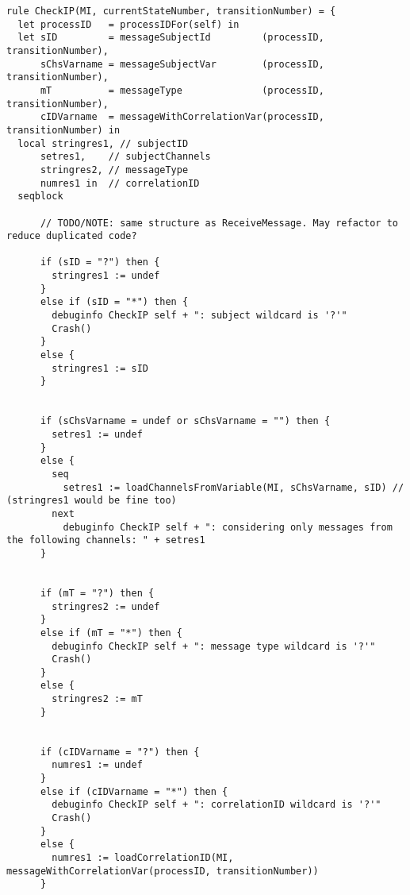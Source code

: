 \begin{listing}[H]
\begin{verbatim}
rule CheckIP(MI, currentStateNumber, transitionNumber) = {
  let processID   = processIDFor(self) in
  let sID         = messageSubjectId         (processID, transitionNumber),
      sChsVarname = messageSubjectVar        (processID, transitionNumber),
      mT          = messageType              (processID, transitionNumber),
      cIDVarname  = messageWithCorrelationVar(processID, transitionNumber) in
  local stringres1, // subjectID
      setres1,    // subjectChannels
      stringres2, // messageType
      numres1 in  // correlationID
  seqblock

      // TODO/NOTE: same structure as ReceiveMessage. May refactor to reduce duplicated code?

      if (sID = "?") then {
        stringres1 := undef
      }
      else if (sID = "*") then {
        debuginfo CheckIP self + ": subject wildcard is '?'"
        Crash()
      }
      else {
        stringres1 := sID
      }


      if (sChsVarname = undef or sChsVarname = "") then {
        setres1 := undef
      }
      else {
        seq
          setres1 := loadChannelsFromVariable(MI, sChsVarname, sID) // (stringres1 would be fine too)
        next
          debuginfo CheckIP self + ": considering only messages from the following channels: " + setres1
      }


      if (mT = "?") then {
        stringres2 := undef
      }
      else if (mT = "*") then {
        debuginfo CheckIP self + ": message type wildcard is '?'"
        Crash()
      }
      else {
        stringres2 := mT
      }


      if (cIDVarname = "?") then {
        numres1 := undef
      }
      else if (cIDVarname = "*") then {
        debuginfo CheckIP self + ": correlationID wildcard is '?'"
        Crash()
      }
      else {
        numres1 := loadCorrelationID(MI, messageWithCorrelationVar(processID, transitionNumber))
      }



\end{verbatim}
\end{listing}
